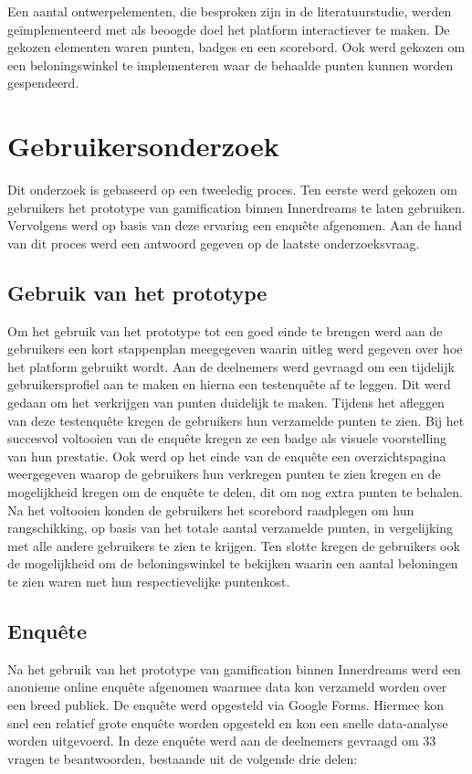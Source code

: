 Een aantal ontwerpelementen, die besproken zijn in de literatuurstudie, werden geïmplementeerd met als beoogde doel het platform interactiever te maken. De gekozen elementen waren punten, badges en een scorebord. Ook werd gekozen om een beloningswinkel te implementeren waar de behaalde punten kunnen worden gespendeerd.

\section{Gebruikersonderzoek}

Dit onderzoek is gebaseerd op een tweeledig proces. Ten eerste werd gekozen om gebruikers het prototype van gamification binnen Innerdreams te laten gebruiken. Vervolgens werd op basis van deze ervaring een enquête afgenomen. Aan de hand van dit proces werd een antwoord gegeven op de laatste onderzoeksvraag.

\subsection{Gebruik van het prototype}

Om het gebruik van het prototype tot een goed einde te brengen werd aan de gebruikers een kort stappenplan meegegeven waarin uitleg werd gegeven over hoe het platform gebruikt wordt. Aan de deelnemers werd gevraagd om een tijdelijk gebruikersprofiel aan te maken en hierna een testenquête af te leggen. Dit werd gedaan om het verkrijgen van punten duidelijk te maken. Tijdens het afleggen van deze testenquête kregen de gebruikers hun verzamelde punten te zien. Bij het succesvol voltooien van de enquête kregen ze een badge als visuele voorstelling van hun prestatie. Ook werd op het einde van de enquête een overzichtspagina weergegeven waarop de gebruikers hun verkregen punten te zien kregen en de mogelijkheid kregen om de enquête te delen, dit om nog extra punten te behalen. Na het voltooien konden de gebruikers het scorebord raadplegen om hun rangschikking, op basis van het totale aantal verzamelde punten, in vergelijking met alle andere gebruikers te zien te krijgen. Ten slotte kregen de gebruikers ook de mogelijkheid om de beloningswinkel te bekijken waarin een aantal beloningen te zien waren met hun respectievelijke puntenkost.

\subsection{Enquête}

Na het gebruik van het prototype van gamification binnen Innerdreams werd een anonieme online enquête afgenomen waarmee data kon verzameld worden over een breed publiek. De enquête werd opgesteld via Google Forms. Hiermee kon snel een relatief grote enquête worden opgesteld en kon een snelle data-analyse worden uitgevoerd. In deze enquête werd aan de deelnemers gevraagd om 33 vragen te beantwoorden, bestaande uit de volgende drie delen:

